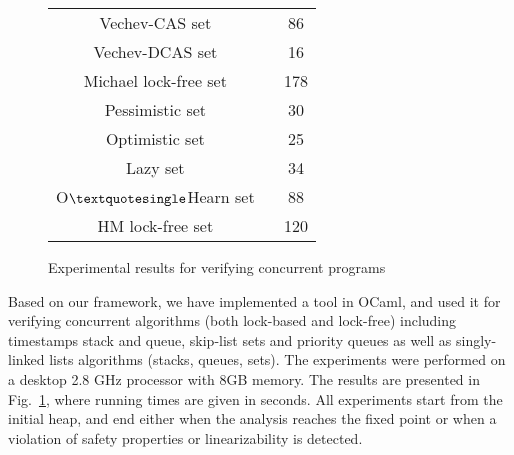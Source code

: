 \begin{figure}[]
\begin{tabular}{|c | c | }
\textsf{Vechev-CAS set  ~\cite{Vechev:list}}  & \textsf{86} \\

\textsf{Vechev-DCAS set  ~\cite{Vechev:list}}   & \textsf{16}  \\

\textsf{Michael lock-free set ~\cite{Michael:list}}  & \textsf{178}  \\

\textsf{Pessimistic set  ~\cite{ArtOfMpP}}&\textsf{30} \\

\textsf{Optimistic set ~\cite{ArtOfMpP}}& \textsf{25} \\

\textsf{Lazy set ~\cite{Lazyset}  }  & \textsf {34} \\

\textsf {O$\textquotesingle $Hearn set  ~\cite{OHearnlist}}     & \textsf{88} \\

\textsf{HM lock-free set  ~\cite{ArtOfMpP} } & \textsf{120} \\
\hline
\end{tabular}

\caption{Experimental results for verifying concurrent programs}
\label{Experiments:fig}
\end{figure}
Based on our framework, we have implemented a tool in OCaml, and used
it for
verifying concurrent algorithms (both lock-based and lock-free)
including timestamps stack and queue, skip-list sets and priority queues as well as singly-linked lists algorithms (stacks, queues, sets). The experiments were performed on a desktop 2.8 GHz processor with 8GB memory. The results are presented in Fig.~\ref{Experiments:fig}, where running times are given in seconds. 
All experiments start from the initial heap,  
and end either when the analysis reaches the fixed point or when a violation of safety properties or linearizability is detected. 

%




